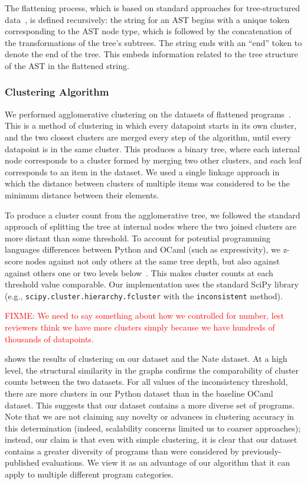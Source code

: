 \documentclass[conference]{IEEEtran}
\newcommand{\fixme}[1]{\textcolor{red}{FIXME: #1}}
\newcommand\lt[1]{{\lstinline|#1|}}
\begin{document}
The flattening process, which is based on standard approaches for
tree-structured data~\cite{dist-site}, is defined recursively: the string
for an AST begins with a unique token corresponding to the AST node type,
which is followed by the concatenation of the transformations of the tree's
subtrees.  The string ends with an ``end'' token to denote the end of the
tree. This embeds information related to the tree structure of the AST in
the flattened string.

\subsubsection{Clustering Algorithm}

We performed agglomerative clustering on the
datasets of flattened programs~\cite{modern-clustering}.
This is a method of clustering in which every datapoint starts in its own
cluster, and the two closest clusters are merged every step of the algorithm,
until every datapoint is in the same cluster. This produces a binary tree, where
each internal node corresponds to a cluster formed by merging two other clusters,
and each leaf corresponds to an item in the dataset. We used a single linkage
approach in which the distance between clusters of multiple items was considered
to be the minimum distance between their elements.

To produce a cluster count from the agglomerative tree, we followed the
standard approach of splitting the tree at internal nodes where the two
joined clusters are more distant than some threshold. To account for
potential programming languages differences between Python and OCaml (such
as expressivity), we z-score nodes against not only others at the same tree
depth, but also against against others one or two levels
below~\cite{inconsistent}. This makes cluster counts at each threshold
value comparable. Our implementation uses the standard
SciPy library (e.g., \lt{scipy.cluster.hierarchy.fcluster} with the
\lt{inconsistent} method).

\fixme{We need to say something about how we controlled for number, lest
reviewers think we have more clusters simply because we have hundreds of
thousands of datapoints.}

 shows the results of clustering on our dataset and the
Nate dataset. At a high level, the structural similarity in the graphs
confirms the comparability of cluster counts between the two datasets.  For
all values of the inconsistency threshold, there are more clusters in our
Python dataset than in the baseline OCaml dataset. This suggests that our
dataset contains a more diverse set of programs. Note that we are not
claiming any novelty or advances in clustering accuracy in this
determination (indeed, scalability concerns limited us to coarser
approaches); instead, our claim is that even with simple clustering,
it is clear that our dataset contains a greater diversity of programs than
were considered by previously-published evaluations.
We view it as an advantage of our algorithm that it can apply to multiple
different program categories.
\end{document}

